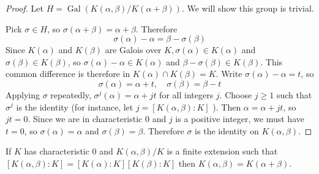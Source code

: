 \begin{proof}
Let $H=\operatorname{Gal}(K(\alpha, \beta) / K(\alpha+\beta))$. We will show this group is trivial.

Pick $\sigma \in H$, so $\sigma(\alpha+\beta)=\alpha+\beta$. Therefore
\[
\sigma(\alpha)-\alpha=\beta-\sigma(\beta)
\]
Since $K(\alpha)$ and $K(\beta)$ are Galois over $K, \sigma(\alpha) \in K(\alpha)$ and $\sigma(\beta) \in K(\beta)$, so $\sigma(\alpha)-\alpha \in K(\alpha)$ and $\beta-\sigma(\beta) \in K(\beta)$. This common difference is therefore in $K(\alpha) \cap K(\beta)=K$. Write $\sigma(\alpha)-\alpha=t$, so
\[
\sigma(\alpha)=\alpha+t, \quad \sigma(\beta)=\beta-t
\]
Applying $\sigma$ repeatedly, $\sigma^j(\alpha)=\alpha+j t$ for all integers $j$. Choose $j \geq 1$ such that $\sigma^j$ is the identity (for instance, let $j=[K(\alpha, \beta): K]$ ). Then $\alpha=\alpha+j t$, so $j t=0$. Since we are in characteristic 0 and $j$ is a positive integer, we must have $t=0$, so $\sigma(\alpha)=\alpha$ and $\sigma(\beta)=\beta$. Therefore $\sigma$ is the identity on $K(\alpha, \beta)$.
\end{proof}

\begin{theorem}[Theorem 7.6]
If $K$ has characteristic 0 and $K(\alpha, \beta) / K$ is a finite extension such that $[K(\alpha, \beta): K]=[K(\alpha): K][K(\beta): K]$ then $K(\alpha, \beta)=K(\alpha+\beta)$.\label{2e605f}
\end{theorem}

